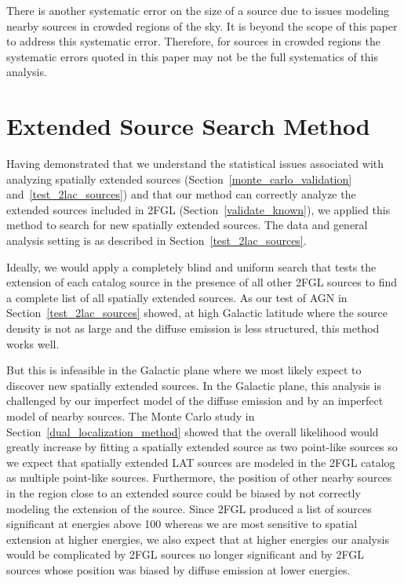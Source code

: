 \documentclass[12pt,preprint]{aastex}
\newcommand{\mev}{\text{MeV}\xspace}
\newcommand{\gev}{\text{GeV}\xspace}
\begin{document}
There is another systematic error on the size of a source due to issues
modeling nearby sources in crowded regions of the sky. It is beyond the
scope of this paper to address this systematic error. Therefore, 
for sources in crowded regions the systematic
errors quoted in this paper may not be the full systematics of this
analysis.

\section{Extended Source Search Method}
\label{extended_source_search_method}


Having demonstrated that we understand the statistical
issues associated with analyzing spatially extended sources
(Section~\ref{monte_carlo_validation} and~\ref{test_2lac_sources}) and
that our method can correctly analyze the extended sources included in
2FGL (Section~\ref{validate_known}), we applied this method to search for
new spatially extended \gev sources.
The data and general analysis setting is as described in Section~\ref{test_2lac_sources}.

Ideally, we would apply a completely blind and uniform search that
tests the extension of each catalog source in the presence of all other
2FGL sources to find a complete list of all spatially extended sources.
As our test of AGN in Section~\ref{test_2lac_sources} showed, at high
Galactic latitude where the source density is not as large and the
diffuse emission is less structured, this method works well.

But this is infeasible in the Galactic plane where we most likely expect
to discover new spatially extended sources.  In the Galactic plane,
this analysis is challenged by our imperfect model of the diffuse
emission and by an imperfect model of nearby sources.  The Monte Carlo
study in Section~\ref{dual_localization_method}
showed that the overall likelihood would greatly increase by fitting
a spatially extended source as two point-like sources so we expect
that spatially extended LAT sources are modeled in the 2FGL catalog as
multiple point-like sources. Furthermore, the position of other nearby sources
in the region close to an extended source could be biased by not correctly
modeling the extension of the source.  Since 2FGL produced a
list of sources significant at energies above 100 \mev whereas we are
most sensitive to spatial extension at higher energies,
we also expect that at higher energies our analysis would be complicated
by 2FGL sources no longer significant and by 2FGL
sources whose position was biased by diffuse emission at lower energies.
\end{document}
